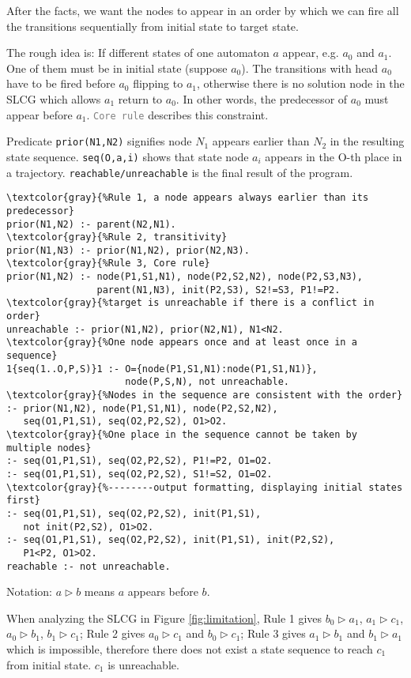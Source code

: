 After the facts, we want the nodes to appear in an order by which we can fire all the transitions sequentially from initial state to target state. 

The rough idea is: If different states of one automaton $a$ appear, e.g. $a_0$ and $a_1$.
One of them must be in initial state (suppose $a_0$).
The transitions with head $a_0$ have to be fired before $a_0$ flipping to $a_1$, otherwise there is no solution node in the SLCG which allows $a_1$ return to $a_0$.
In other words, the predecessor of $a_0$ must appear before $a_1$. \texttt{\textcolor{gray}{Core rule}} describes this constraint.

Predicate \texttt{prior(N1,N2)} signifies node $N_1$ appears earlier than $N_2$ in the resulting state sequence.
\texttt{seq(O,a,i)} shows that state node $a_i$ appears in the O-th place in a trajectory.
\texttt{reachable/unreachable} is the final result of the program.

\begin{Verbatim}[commandchars=\\\{\}]
\textcolor{gray}{%Rule 1, a node appears always earlier than its predecessor}
prior(N1,N2) :- parent(N2,N1).
\textcolor{gray}{%Rule 2, transitivity}
prior(N1,N3) :- prior(N1,N2), prior(N2,N3).
\textcolor{gray}{%Rule 3, Core rule}
prior(N1,N2) :- node(P1,S1,N1), node(P2,S2,N2), node(P2,S3,N3), 
                parent(N1,N3), init(P2,S3), S2!=S3, P1!=P2. 
\textcolor{gray}{%target is unreachable if there is a conflict in order}
unreachable :- prior(N1,N2), prior(N2,N1), N1<N2.
\textcolor{gray}{%One node appears once and at least once in a sequence}
1{seq(1..O,P,S)}1 :- O={node(P1,S1,N1):node(P1,S1,N1)},
                     node(P,S,N), not unreachable.
\textcolor{gray}{%Nodes in the sequence are consistent with the order}
:- prior(N1,N2), node(P1,S1,N1), node(P2,S2,N2),
   seq(O1,P1,S1), seq(O2,P2,S2), O1>O2.
\textcolor{gray}{%One place in the sequence cannot be taken by multiple nodes}
:- seq(O1,P1,S1), seq(O2,P2,S2), P1!=P2, O1=O2.
:- seq(O1,P1,S1), seq(O2,P2,S2), S1!=S2, O1=O2.
\textcolor{gray}{%--------output formatting, displaying initial states first}
:- seq(O1,P1,S1), seq(O2,P2,S2), init(P1,S1),
   not init(P2,S2), O1>O2.
:- seq(O1,P1,S1), seq(O2,P2,S2), init(P1,S1), init(P2,S2),
   P1<P2, O1>O2.
reachable :- not unreachable.
\end{Verbatim}

Notation: $a\rhd b$ means $a$ appears before $b$.

When analyzing the SLCG in Figure \ref{fig:limitation},
Rule 1 gives $b_0\rhd a_1$, $a_1\rhd c_1$, $a_0\rhd b_1$, $b_1\rhd c_1$; Rule 2 gives $a_0\rhd c_1$ and $b_0\rhd c_1$; Rule 3 gives $a_1\rhd b_1$ and $b_1\rhd a_1$ which is impossible, therefore there does not exist a state sequence to reach $c_1$ from initial state.
$c_1$ is unreachable.

